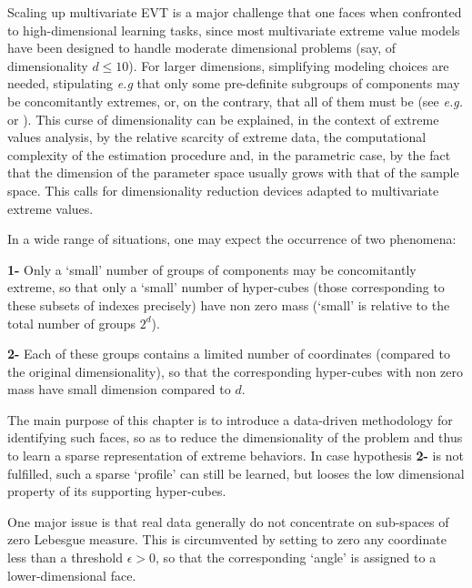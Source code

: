 {Scaling up multivariate EVT} is a major challenge that one
faces when confronted to high-dimensional learning
tasks, since most multivariate extreme value models have been
designed to handle moderate dimensional problems (say, of dimensionality  $d\le 10$). %
For larger dimensions, 
 simplifying modeling choices are needed,
 stipulating \emph{e.g} that only some pre-definite subgroups of components
 may be concomitantly extremes, or, on the contrary, that all of them
 must be (see  \emph{e.g.} 
 \cite{stephenson2009high} or \cite{sabourinNaveau2012}).
This curse of dimensionality can be explained, in the context of
extreme values analysis, by the relative  scarcity of extreme  data,
the  computational
complexity of the estimation procedure and, in the parametric case, by 
the fact that the dimension of the parameter space usually grows with
that of the sample space. This calls for dimensionality reduction devices
adapted to multivariate extreme values.

In a wide range of situations, one may expect the occurrence of two phenomena:

\noindent
\textbf{1-} Only a `small' number of groups of components may be concomitantly extreme, so that only a `small' number of hyper-cubes (those corresponding to these subsets of indexes precisely) have non zero mass (`small' is relative to the total number of groups $2^d$).

\noindent
\textbf{2-} Each of these groups contains a limited number of coordinates (compared to the original dimensionality), so that the corresponding hyper-cubes with non zero mass have small dimension compared to $d$.

\noindent
The main purpose of this chapter is to introduce a data-driven
methodology for identifying such faces, so as to reduce the
dimensionality of the problem and thus to learn a sparse 
representation  of extreme behaviors. 
In case hypothesis \textbf{2-} is not fulfilled, such a sparse  `profile' can still be learned, but looses the low dimensional property of its supporting hyper-cubes.

One major issue is that real data generally do not concentrate on sub-spaces of zero Lebesgue measure. This is circumvented by setting to zero any coordinate less than a threshold $\epsilon>0$, so that the corresponding `angle' is assigned to a lower-dimensional face. 






